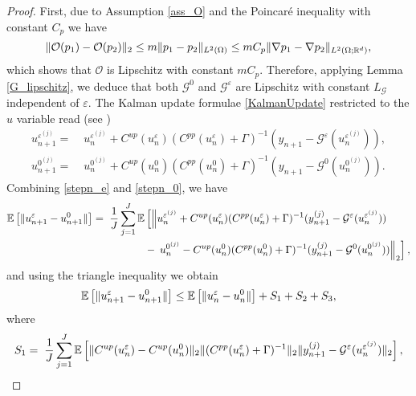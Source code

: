 \begin{proof}
First, due to Assumption \ref{ass_O} and the Poincaré inequality with constant $C_p$ we have
\begin{equation*}
\lVert\mathcal{O}(p_1) - \mathcal{O}(p_2)\rVert_2 \le m \lVert p_1 - p_2\rVert_{L^2(\Omega)} \le m C_p \lVert\nabla p_1 - \nabla p_2\rVert_{L^2(\Omega; \mathbb{R}^d)},
\end{equation*}
which shows that $\mathcal{O}$ is Lipschitz with constant $m C_p$. Therefore, applying Lemma \ref{G_lipschitz}, we deduce that both $\mathcal{G}^0$ and $\mathcal{G}^{\varepsilon}$ are Lipschitz with constant $L_{\mathcal{G}}$ independent of $\varepsilon$. The Kalman update formulae \eqref{KalmanUpdate} restricted to the $u$ variable read (see \cite{ILS13})
\begin{align}
\label{stepn_e}
u_{n+1}^{\varepsilon^{(j)}} = & \; u_{n}^{\varepsilon^{(j)}} + C^{up}(u_n^{\varepsilon}) (C^{pp}(u_n^{\varepsilon}) + \Gamma)^{-1} (y_{n+1} - \mathcal{G}^{\varepsilon}(u_n^{\varepsilon^{(j)}})), \\
\label{stepn_0}
u_{n+1}^{0^{(j)}} = & \; u_{n}^{0^{(j)}} + C^{up}(u_n^{0}) (C^{pp}(u_n^{0}) + \Gamma)^{-1} (y_{n+1} - \mathcal{G}^{0}(u_n^{0^{(j)}})).
\end{align}
Combining \eqref{stepn_e} and \eqref{stepn_0}, we have
\begin{align*}
\mathbb{E} \left [ \lVert u_{n+1}^{\varepsilon} - u_{n+1}^0\rVert \right ]  = \; \frac{1}{J} \sum_{j=1}^J \mathbb{E} &\left [ \left \lVert u_{n}^{\varepsilon^{(j)}} + C^{up}(u_n^{\varepsilon}) (C^{pp}(u_n^{\varepsilon}) + \Gamma)^{-1} (y_{n+1}^{(j)} - \mathcal{G}^{\varepsilon}(u_n^{\varepsilon^{(j)}})) \right. \right. \\
&- \left. \left. u_{n}^{0^{(j)}} - C^{up}(u_n^{0}) (C^{pp}(u_n^{0}) + \Gamma)^{-1} (y_{n+1}^{(j)} - \mathcal{G}^{0}(u_n^{0^{(j)}})) \right \rVert_2 \right ],
\end{align*}
and using the triangle inequality we obtain
\begin{equation}\label{decomp}
\mathbb{E} \left [ \lVert u_{n+1}^{\varepsilon} - u_{n+1}^0\rVert \right ] \leq \operatorname{\mathbb{E}} \left [ \lVert u_n^{\varepsilon} - u_n^0\rVert \right ]  + S_1 + S_2 + S_3,
\end{equation}
where
\begin{align}
\label{2}
S_1 &= \; \frac{1}{J} \sum_{j=1}^J \mathbb{E} \left [ \norm{C^{up}(u_n^{\varepsilon}) - C^{up}(u_n^0)}_2 \norm{(C^{pp}(u_n^{\varepsilon}) + \Gamma)^{-1}}_2 \norm{y_{n+1}^{(j)} - \mathcal{G}^{\varepsilon}(u_n^{\varepsilon^{(j)}})}_2 \right ], \\ \label{3}

\end{align}
\end{proof}
